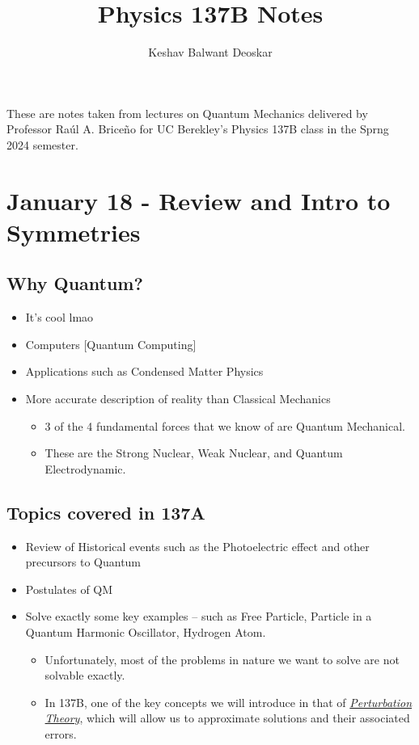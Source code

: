 \documentclass{article}
\title{Physics 137B Notes}
\author{Keshav Balwant Deoskar}
\begin{document}
\maketitle

These are notes taken from lectures on Quantum Mechanics delivered by Professor Raúl A. Briceño for UC Berekley's Physics 137B class in the Sprng 2024 semester.

\tableofcontents

\pagebreak

\section{January 18 - Review and Intro to Symmetries}

\subsection{Why Quantum?}
\begin{itemize}
  \item It's cool lmao
  \item Computers [Quantum Computing]
  \item Applications such as Condensed Matter Physics
  \item More accurate description of reality than Classical Mechanics
    \begin{itemize}
      \item 3 of the 4 fundamental forces that we know of are Quantum Mechanical.
      \item These are the Strong Nuclear, Weak Nuclear, and Quantum Electrodynamic.
    \end{itemize}
\end{itemize}
\vskip 0.5cm

\subsection{Topics covered in 137A}
\begin{itemize}
  \item Review of Historical events such as the Photoelectric effect and other precursors to Quantum
  \item Postulates of QM
  \item Solve exactly some key examples -- such as Free Particle, Particle in a Quantum Harmonic Oscillator, Hydrogen Atom.
    \begin{itemize}
      \item Unfortunately, most of the problems in nature we want to solve are not solvable exactly. 
      \item In 137B, one of the key concepts we will introduce in that of \emph{\underline{Perturbation Theory}}, which will allow us to approximate solutions and their associated errors.
    \end{itemize}
\end{itemize}
\end{document}
